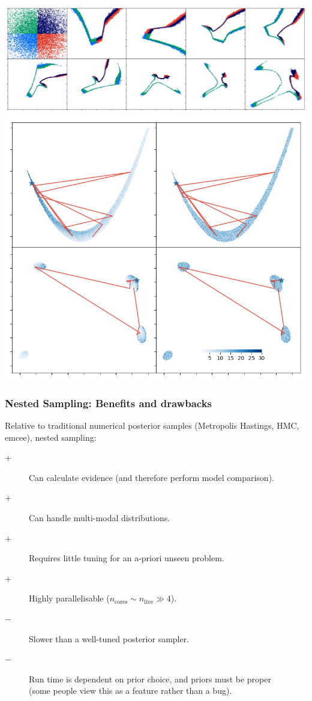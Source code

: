\documentclass[aspectratio=169]{beamer}
\begin{document}
\begin{frame}
{{                \includegraphics[width=\textwidth]{himmelblau_flow.png}
            }{
                \includegraphics[width=\textwidth]{chains.png}
            }
            \vfill
    }
\end{frame}

\begin{frame}
    \frametitle{Nested Sampling: Benefits and drawbacks}
    Relative to traditional numerical posterior samples (Metropolis Hastings, HMC, emcee), nested sampling:
    \begin{description}
        \item[$+$] Can calculate evidence (and therefore perform model comparison).
        \item[$+$] Can handle multi-modal distributions.
        \item[$+$] Requires little tuning for an a-priori unseen problem.
        \item[$+$] Highly parallelisable ($n_\mathrm{cores} \sim n_\mathrm{live} \gg 4$).
        \item[$-$] Slower than a well-tuned posterior sampler.
        \item[$-$] Run time is dependent on prior choice, and priors must be proper \\(some people view this as a feature rather than a bug).
    \end{description}
\end{frame}
\end{document}
